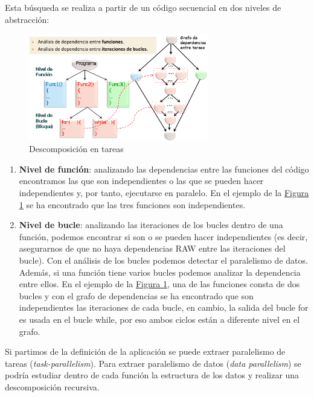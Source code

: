 \documentclass[10pt,a4paper,spanish]{report}
\begin{document}
Esta búsqueda se realiza a partir de un código secuencial en dos niveles de abstracción:
    \begin{figure}[!h]
        \centering
        \includegraphics[width=0.7\textwidth]{41}
        \caption{Descomposición en tareas}
        \label{destareas}
    \end{figure}
\begin{enumerate}[\color{azul}{\bf $\heartsuit$}]
    \item \textcolor[rgb]{0.2,0.4,0.8}{\textbf{Nivel de función}}: analizando las dependencias entre las funciones del código encontramos las que son independientes o las que se pueden hacer independientes y, por tanto, ejecutarse en paralelo. En el ejemplo de la \hyperref[destareas]{Figura \ref*{destareas}} se ha encontrado que las tres funciones son independientes.
    \item \textcolor[rgb]{0.2,0.4,0.8}{\textbf{Nivel de bucle}}: analizando las iteraciones de los bucles dentro de una función, podemos encontrar si son o se pueden hacer independientes (es decir, asegurarnos de que no haya dependencias RAW entre las iteraciones del bucle). Con el análisis de los bucles podemos detectar el paralelismo de datos. Además, si una función tiene varios bucles podemos analizar la dependencia entre ellos. En el ejemplo de la \hyperref[destareas]{Figura \ref*{destareas}}, una de las funciones consta de dos bucles y con el grafo de dependencias se ha encontrado que son independientes las iteraciones de cada bucle, en cambio, la salida del bucle for es usada en el bucle while, por eso ambos ciclos están a diferente nivel en el grafo.
\end{enumerate}

Si partimos de la definición de la aplicación se puede extraer paralelismo de tareas (\textcolor[rgb]{0.2,0.4,0.8}{\textit{task-parallelism}}). Para extraer paralelismo de datos (\textcolor[rgb]{0.2,0.4,0.8}{\textit{data parallelism}}) se podría estudiar dentro de cada función la estructura de los datos y realizar una descomposición recursiva.
\end{document}
